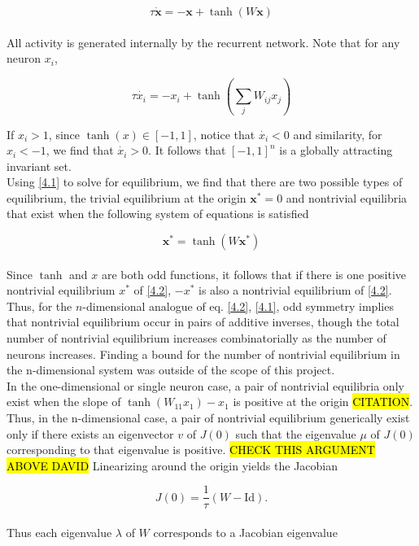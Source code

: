 \documentclass[paper=a4, fontsize=11pt]{scrartcl} %
\numberwithin{equation}{section} %
\numberwithin{figure}{section} %
\numberwithin{table}{section} %
\newcommand \bf[1]{\mathbf #1}
\begin{document}
\begin{equation} \label{4.1}
    \tau \dot{\bf{x}}  = -\bf{x} +  \tanh(W {\bf x})
\end{equation}
\\

All activity is generated internally by the recurrent network. Note that for any neuron $x_i$,

\begin{equation} \label{4.2}
    \tau \dot{x_i}  = -x_i +  \tanh \left(\sum_j W_{ij} x_j \right)
\end{equation}

If $x_i > 1$, since $\tanh(x)\in [-1,1]$, notice that $\dot{x_i} < 0$ and similarity, for $x_i < -1$, we find that $\dot{x_i} > 0$. It follows that $[-1,1]^n$ is a globally attracting invariant set.
\vspace{0.5cm}
\\
Using \eqref{4.1} to solve for equilibrium, we find that there are two possible types of equilibrium, the trivial equilibrium at the origin $\bf x^*=0$ and nontrivial equilibria that exist when the following system of equations is satisfied

\begin{equation}
    \bf x^* = \tanh (W \bf x^*)
\end{equation}
\\
Since $\tanh$ and $x$ are both odd functions, it follows that if there is one positive nontrivial equilibrium $x^*$ of \eqref{4.2}, $-x^*$ is also a nontrivial equilibrium of \eqref{4.2}. Thus, for the $n$-dimensional analogue of eq. \eqref{4.2}, \eqref{4.1}, odd symmetry implies that nontrivial equilibrium occur in pairs of additive inverses, though the total number of nontrivial equilibrium increases combinatorially as the number of neurons increases. Finding a bound for the number of nontrivial equilibrium in the n-dimensional system was outside of the scope of this project.
\vspace{0.5cm}
\\
In the one-dimensional or single neuron case, a pair of nontrivial equilibria only exist when the slope of $\tanh(W_{11}x_1)-x_1$ is positive at the origin \hl{CITATION}. Thus, in the n-dimensional case, a pair of nontrivial equilibrium generically exist only if there exists an eigenvector $v$ of $J(0)$ such that the eigenvalue $\mu$ of $J(0)$ corresponding to that eigenvalue is positive. \hl{CHECK THIS ARGUMENT ABOVE DAVID} Linearizing around the origin yields the Jacobian

\begin{equation}
    J(0) = \frac{1}{\tau}(W - \text{Id}). 
\end{equation}
\\
Thus each eigenvalue \(\lambda\) of \(W\) corresponds to a Jacobian eigenvalue
\end{document}
